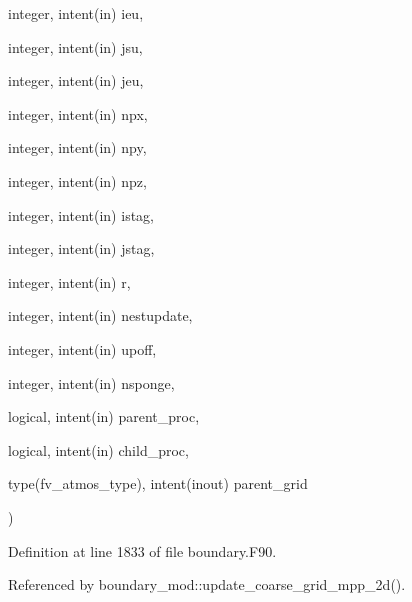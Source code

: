 {\begin{DoxyParamCaption}
\item[{integer, intent(in)}]{ieu, }
\item[{integer, intent(in)}]{jsu, }
\item[{integer, intent(in)}]{jeu, }
\item[{integer, intent(in)}]{npx, }
\item[{integer, intent(in)}]{npy, }
\item[{integer, intent(in)}]{npz, }
\item[{integer, intent(in)}]{istag, }
\item[{integer, intent(in)}]{jstag, }
\item[{integer, intent(in)}]{r, }
\item[{integer, intent(in)}]{nestupdate, }
\item[{integer, intent(in)}]{upoff, }
\item[{integer, intent(in)}]{nsponge, }
\item[{logical, intent(in)}]{parent\-\_\-proc, }
\item[{logical, intent(in)}]{child\-\_\-proc, }
\item[{type(fv\-\_\-atmos\-\_\-type), intent(inout)}]{parent\-\_\-grid}
\end{DoxyParamCaption}
)}\label{interfaceboundary__mod_1_1update__coarse__grid_a6d38bb2a38da012a2464e7255edd6983}


Definition at line 1833 of file boundary.\-F90.



Referenced by boundary\-\_\-mod\-::update\-\_\-coarse\-\_\-grid\-\_\-mpp\-\_\-2d().


